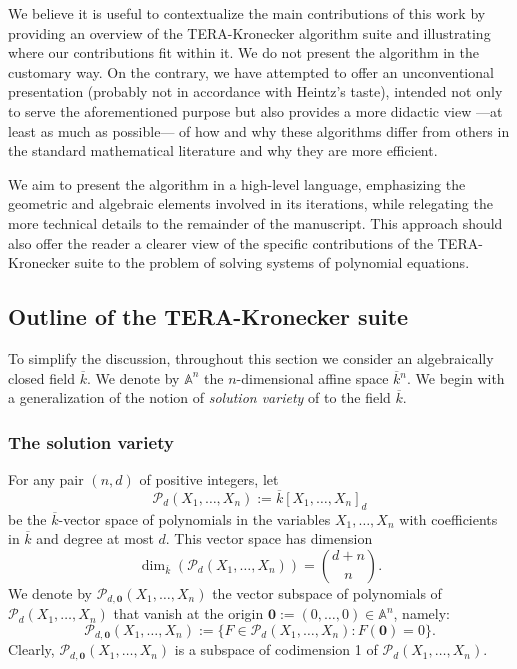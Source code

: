 \documentclass[pdflatex,sn-basic]{sn-jnl}%
\theoremstyle{thmstyleone}%
\theoremstyle{thmstyletwo}%
\theoremstyle{thmstylethree}%
\theoremstyle{definition}
\numberwithin{equation}{section}
\newcommand{\bfs}{\boldsymbol}
\newcommand{\A}{\mathbb A}
\begin{document}
We believe it is useful to contextualize the main contributions of
this work by providing an overview of the TERA-Kronecker algorithm
suite and illustrating where our contributions fit within it. We do
not present the algorithm in the customary way. On the contrary, we
have attempted to offer an unconventional presentation (probably not
in accordance with Heintz's taste), intended not only to serve the
aforementioned purpose but also provides a more didactic view ---at
least as much as possible--- of how and why these algorithms differ
from others in the standard mathematical literature and why they are
more efficient.

We aim to present the algorithm in a high-level language,
emphasizing the geometric and algebraic elements involved in its
iterations, while relegating the more technical details to the
remainder of the manuscript. This approach should also offer the
reader a clearer view of the specific contributions of the
TERA-Kronecker suite to the problem of solving systems of polynomial
equations.
%
%
\subsection{Outline of the TERA-Kronecker suite}
%
To simplify the discussion, throughout this section we consider an
algebraically closed field $\overline{k}$. We denote by $\A^n$ the
$n$-dimensional affine space $\overline{k}{}^n$. We begin with a
generalization of the notion of {\em solution variety} of
\cite{ShSm93} to the field $\overline{k}$.
%
\subsubsection{The solution variety}
\label{subsec: solution variety} For any pair $(n,d)$ of positive
integers, let
%
$$\mathcal{P}_d(X_1,\ldots,X_n):=\overline{k}[X_1,\ldots,X_n]_d$$
%
be the $\overline{k}$-vector space of polynomials in the variables
$X_1,\ldots,X_n$ with coefficients in $\overline{k}$ and degree at
most $d$. This vector space has dimension
%
$$\dim_{\overline{k}}(\mathcal{P}_d(X_1,\ldots,X_n))=
\binom{d+n}{n}.$$
%
We denote by $\mathcal{P}_{d,\bfs 0}(X_1,\ldots,X_n)$ the vector
subspace of polynomials of $\mathcal{P}_d(X_1,\ldots,X_n)$ that
vanish at the origin $\bfs 0:=(0,\ldots,0)\in\A^n$, namely:
%
$$\mathcal{P}_{d,\bfs 0}(X_1,\ldots,X_n):=
\{F\in \mathcal{P}_d(X_1,\ldots,X_n):F(\bfs 0)=0\}.$$
%
Clearly, $\mathcal{P}_{d,\bfs 0}(X_1,\ldots,X_n)$ is a subspace of
codimension 1 of $\mathcal{P}_{d}(X_1,\ldots,X_n)$.
\end{document}

